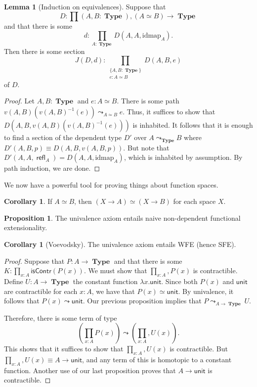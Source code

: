 \documentclass[10pt,letterpaper,cm]{nupset}
\theoremstyle{definition}
\theoremstyle{theorem}
\newtheorem{lemma}[definition]{Lemma}
\newtheorem{prop}[definition]{Proposition}
\newtheorem{corollary}[definition]{Corollary}
\theoremstyle{remark}
\newcommand{\1}{\mathbf{1}}
\newcommand{\0}{\vec 0}
\DeclareMathOperator{\refl}{\mathsf{refl}}
\DeclareMathOperator{\type}{\mathbf{Type}}
\begin{document}
\begin{lemma}[Induction on equivalences] 
Suppose that $$D: \prod(A, B : \type), (A \simeq B) \to \type$$ and that there is some $$d: \prod_{A: \type}D(A, A, \text{idmap}_A).$$ Then there is some section  $$J(D, d)  :  \prod_{\substack{\{A,B:\type\} \\ e:A\simeq B}} D(A,B,e) $$ of $D$. 
\end{lemma}
\begin{proof}
Let $A,B: \type$ and $e: A \simeq B$. There is some path $v(A,B)(v(A,B)^{{-}1}(e))\leadsto_{A\simeq B} e$. Thus, it suffices to show that $D(A, B, v(A,B)(v(A,B)^{{-}1}(e)))$ is inhabited. It follows that it is enough to find a section of the dependent type $D'$ over $A\leadsto_{\type} B$ where $D'(A, B, p) \equiv D(A, B, v(A, B, p))$. But note that $D'(A, A, \refl_A) = D(A, A, \text{idmap}_A)$, which is inhabited by assumption. By path induction, we are done.
\end{proof}

We now have a powerful tool for proving things about function spaces.

\begin{corollary}
If $A \simeq B$, then $(X \to A) \simeq (X \to B)$ for each space $X$.
\end{corollary}

\begin{prop}
The univalence axiom entails naive non-dependent functional extensionality. 
\end{prop}

\begin{corollary}[Voevodsky]
The univalence axiom entails WFE (hence SFE).
\end{corollary}
\begin{proof}
Suppose that $P: A \to \type$ and that there is some $K: \prod_{x:A}\mathsf{isContr}(P(x))$. We must show that $\prod_{x:A}, P(x)$ is contractible.  Define $U: A \to \type$ the constant function $\lambda x. \mathsf{unit}$. Since both $P(x)$ and $ \mathsf{unit}$ are contractible for each $x:A$, we have that $P(x) \simeq  \mathsf{unit}$. By univalence, it follows that $P(x) \leadsto  \mathsf{unit}$.  Our previous proposition implies that $P\leadsto_{A \to \type} U$.

\medskip

 Therefore, there is some term of type $$  \left(\prod_{x:A} P(x) \right) \leadsto \left(\prod_{x:A}, U(x) \right)  .$$ This shows that it suffices to show that $\prod_{x:A}, U(x)$ is contractible.  But $\prod_{x:A}, U(x) \equiv A \to \mathsf{unit}$, and any term of this is homotopic to a constant function. Another use of our last proposition proves that $A \to \mathsf{unit}$ is contractible. 
\end{proof}
\end{document}
